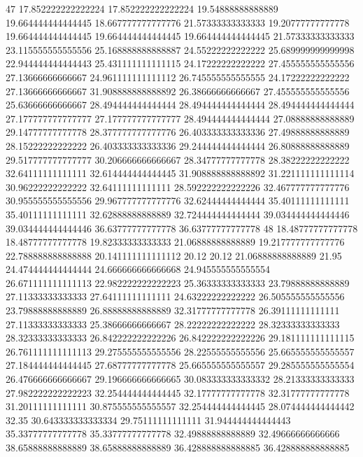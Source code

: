 47 17.852222222222224 17.852222222222224 19.54888888888889 19.664444444444445 18.667777777777776 21.57333333333333 19.20777777777778 19.664444444444445 19.664444444444445 19.664444444444445 21.57333333333333 23.115555555555556 25.168888888888887 24.55222222222222 25.689999999999998 22.944444444444443 25.431111111111115 24.17222222222222 27.455555555555556 27.13666666666667 24.961111111111112 26.745555555555555 24.17222222222222 27.13666666666667 31.908888888888892 26.38666666666667 27.455555555555556 25.63666666666667 28.494444444444444 28.494444444444444 28.494444444444444 27.177777777777777 27.177777777777777 28.494444444444444 27.08888888888889 29.14777777777778 28.377777777777776 26.403333333333336 27.49888888888889 28.15222222222222 26.403333333333336 29.244444444444444 26.80888888888889 29.517777777777777 30.206666666666667 28.34777777777778 28.38222222222222 32.64111111111111 32.614444444444445 31.908888888888892 31.221111111111114 30.96222222222222 32.64111111111111 28.592222222222226 32.467777777777776 30.955555555555556 29.967777777777776 32.62444444444444 35.40111111111111 35.40111111111111 32.62888888888889 32.724444444444444 39.034444444444446 39.034444444444446 36.63777777777778 36.63777777777778
48 18.48777777777778 18.48777777777778 19.82333333333333 21.06888888888889 19.217777777777776 22.788888888888888 20.141111111111112 20.12 20.12 21.06888888888889 21.95 24.474444444444444 24.666666666666668 24.945555555555554 26.671111111111113 22.982222222222223 25.36333333333333 23.79888888888889 27.11333333333333 27.64111111111111 24.63222222222222 26.505555555555556 23.79888888888889 26.88888888888889 32.31777777777778 26.39111111111111 27.11333333333333 25.38666666666667 28.22222222222222 28.32333333333333 28.32333333333333 26.842222222222226 26.842222222222226 29.181111111111115 26.761111111111113 29.275555555555556 28.22555555555556 25.665555555555557 27.184444444444445 27.68777777777778 25.665555555555557 29.285555555555554 26.476666666666667 29.196666666666665 30.083333333333332 28.21333333333333 27.982222222222223 32.254444444444445 32.17777777777778 32.31777777777778 31.20111111111111 30.875555555555557 32.254444444444445 28.074444444444442 32.35 30.643333333333334 29.75111111111111 31.944444444444443 35.33777777777778 35.33777777777778 32.49888888888889 32.49666666666666 38.65888888888889 38.65888888888889 36.428888888888885 36.428888888888885
